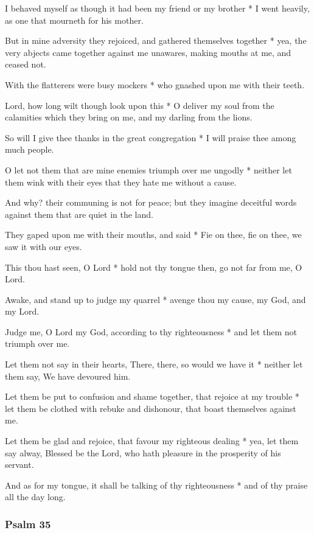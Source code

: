 I behaved myself as though it had been my friend or my brother * I went heavily, as one that mourneth for his mother.

But in mine adversity they rejoiced, and gathered themselves together * yea, the very abjects came together against me unawares, making mouths at me, and ceased not.

With the flatterers were busy mockers * who gnashed upon me with their teeth.

Lord, how long wilt though look upon this * O deliver my soul from the calamities which they bring on me, and my darling from the lions.

So will I give thee thanks in the great congregation * I will praise thee among much people.

O let not them that are mine enemies triumph over me ungodly * neither let them wink with their eyes that they hate me without a cause.

And why? their communing is not for peace; but they imagine deceitful words against them that are quiet in the land.

They gaped upon me with their mouths, and said * Fie on thee, fie on thee, we saw it with our eyes.

This thou hast seen, O Lord * hold not thy tongue then, go not far from me, O Lord.

Awake, and stand up to judge my quarrel * avenge thou my cause, my God, and my Lord.

Judge me, O Lord my God, according to thy righteousness * and let them not triumph over me.

Let them not say in their hearts, There, there, so would we have it * neither let them say, We have devoured him.

Let them be put to confusion and shame together, that rejoice at my trouble * let them be clothed with rebuke and dishonour, that boast themselves against me.

Let them be glad and rejoice, that favour my righteous dealing * yea, let them say alway, Blessed be the Lord, who hath pleasure in the prosperity of his servant.

And as for my tongue, it shall be talking of thy righteousness * and of thy praise all the day long.

\subsubsection{Psalm 35}


